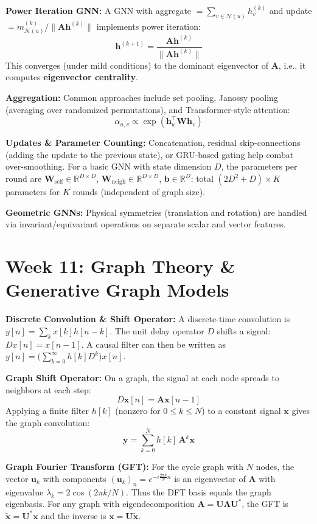 \documentclass[12pt]{article}
\begin{document}
\textbf{Power Iteration GNN:} A GNN with aggregate $= \sum_{v\in\mathcal{N}(u)} h_v^{(k)}$ and update $= m_{\mathcal{N}(u)}^{(k)} / \|\bm{A}\bm{h}^{(k)}\|$ implements power iteration:
\[
\bm{h}^{(k+1)} = \frac{\bm{A}\bm{h}^{(k)}}{\|\bm{A}\bm{h}^{(k)}\|}
\]
This converges (under mild conditions) to the dominant eigenvector of $\bm{A}$, i.e., it computes \textbf{eigenvector centrality}.

\textbf{Aggregation:} Common approaches include set pooling, Janossy pooling (averaging over randomized permutations), and Transformer-style attention:
\[
\alpha_{u,v} \propto \exp\!\left(\bm{h}_u^\top \bm{W} \bm{h}_v\right)
\]

\textbf{Updates \& Parameter Counting:} Concatenation, residual skip-connections (adding the update to the previous state), or GRU-based gating help combat over-smoothing. For a basic GNN with state dimension $D$, the parameters per round are $\bm{W}_\text{self} \in \mathbb{R}^{D\times D}$, $\bm{W}_\text{neigh} \in \mathbb{R}^{D\times D}$, $\bm{b} \in \mathbb{R}^D$: total $(2D^2 + D) \times K$ parameters for $K$ rounds (independent of graph size).

\textbf{Geometric GNNs:} Physical symmetries (translation and rotation) are handled via invariant/equivariant operations on separate scalar and vector features.

\section*{Week 11: Graph Theory \& Generative Graph Models}

\textbf{Discrete Convolution \& Shift Operator:} A discrete-time convolution is $y[n] = \sum_k x[k]h[n-k]$. The unit delay operator $D$ shifts a signal: $Dx[n] = x[n-1]$. A causal filter can then be written as $y[n] = \bigl(\sum_{k=0}^\infty h[k]D^k\bigr)x[n]$.

\textbf{Graph Shift Operator:} On a graph, the signal at each node spreads to neighbors at each step:
\[
D\bm{x}[n] = \bm{A}\bm{x}[n-1]
\]
Applying a finite filter $h[k]$ (nonzero for $0 \le k \le N$) to a constant signal $\bm{x}$ gives the graph convolution:
\[
\bm{y} = \sum_{k=0}^{N} h[k]\,\bm{A}^k\bm{x}
\]

\textbf{Graph Fourier Transform (GFT):} For the cycle graph with $N$ nodes, the vector $\bm{u}_k$ with components $(\bm{u}_k)_n = e^{-i\frac{2\pi k}{N}n}$ is an eigenvector of $\bm{A}$ with eigenvalue $\lambda_k = 2\cos(2\pi k / N)$. Thus the DFT basis equals the graph eigenbasis. For any graph with eigendecomposition $\bm{A} = \bm{U}\bm{\Lambda}\bm{U}^*$, the GFT is $\tilde{\bm{x}} = \bm{U}^*\bm{x}$ and the inverse is $\bm{x} = \bm{U}\tilde{\bm{x}}$.
\end{document}
